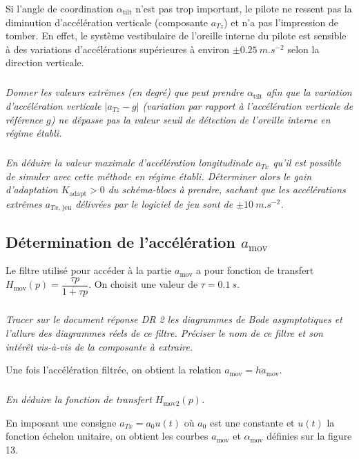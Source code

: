 \documentclass[10pt,fleqn]{article} %
\begin{document}
Si l'angle de coordination $\alpha_{\text{tilt}}$ n'est pas trop important, le pilote ne ressent pas la diminution d'accélération verticale (composante $a_{Tz}$) et n'a pas l'impression de tomber. En effet, le système vestibulaire de l'oreille interne du pilote est sensible à des variations d'accélérations supérieures à environ $\pm \SI{0,25}{m.s^{-2}}$ selon la direction verticale. 

\subparagraph{}\textit{Donner les valeurs extrêmes (en degré) que peut prendre $\alpha_{\text{tilt}}$ afin que la variation d'accélération verticale $ \left|a_{Tz} - g\right|$ (variation par rapport à l'accélération verticale de référence $g$) ne dépasse pas la valeur seuil de détection de l'oreille interne en régime établi.}

\subparagraph{}\textit{En déduire la valeur maximale d'accélération longitudinale $a_{Tx}$ qu'il est possible de simuler avec cette méthode en régime établi. Déterminer alors le gain d'adaptation $K_{\text{adapt}}> 0$ du schéma-blocs à prendre, sachant que les accélérations extrêmes $a_{Tx\text{, jeu}}$ délivrées par le logiciel de jeu sont de $\pm \SI{10}{m.s^{-2}}$.}


\subsection{Détermination de l'accélération $a_{\text{mov}}$}

Le filtre utilisé pour accéder à la partie $a_{\text{mov}}$ a pour fonction de transfert $H_{\text{mov}} (p)= \dfrac{\tau p}{1+\tau p}$. On choisit une valeur de $\tau = \SI{0,1}{s}$. 


\subparagraph{}\textit{Tracer sur le document réponse DR 2 les diagrammes de Bode asymptotiques et l'allure des diagrammes réels de ce filtre. Préciser le nom de ce filtre et son intérêt vis-à-vis de la composante à extraire. }

Une fois l'accélération filtrée, on obtient la relation $a_{\text{mov}}=h\ddot{a}_{\text{mov}}$.

\subparagraph{}\textit{En déduire la fonction de transfert $H_{\text{mov2}}(p)$.}

En imposant une consigne $a_{Tx} = a_0 u(t)$ où $a_0$ est une constante et $u(t)$ la fonction échelon unitaire, on obtient les courbes $a_{\text{mov}}$ et $\alpha_{\text{mov}}$ définies sur la figure 13. 
\end{document}
